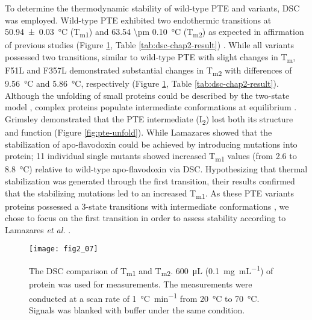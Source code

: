 \begin{refsection}
To determine the thermodynamic stability of wild-type PTE and variants, DSC was
employed.  Wild-type PTE exhibited two endothermic transitions at
\SI{50.94\pm0.03}{\celsius} (T\textsubscript{m1}) and \SI{63.54 \pm
0.10}{\celsius} (T\textsubscript{m2}) as expected in affirmation of previous
studies (Figure \ref{fig:dsc-chap2-result}, Table \ref{tab:dsc-chap2-result})
\cite{Baker2011b}. While all variants possessed two transitions, similar to
wild-type PTE with slight changes in T\textsubscript{m}, F51L and F357L
demonstrated substantial changes in T\textsubscript{m2} with differences of
\SI{9.56}{\celsius} and \SI{5.86}{\celsius}, respectively (Figure
\ref{fig:dsc-chap2-result}, Table \ref{tab:dsc-chap2-result}). Although the
unfolding of small proteins could be described by the two-state model
\cite{Jackson1998}, complex proteins populate intermediate conformations at
equilibrium \cite{Lamazares2015,Barrick1993,Gualfetti1999}. Grimsley  demonstrated that the PTE intermediate (I\textsubscript{2}) lost both
its structure and function \cite{Rochu2002b,Grimsley1997b} (Figure
\ref{fig:pte-unfold}). While Lamazares 
showed that the stabilization of apo-flavodoxin could be achieved by
introducing mutations into protein; 11 individual single mutants showed
increased T\textsubscript{m1} values (from 2.6 to \SI{8.8}{\celsius})
relative to wild-type apo-flavodoxin \cite{Lamazares2015} via DSC.
Hypothesizing that thermal stabilization was generated through the first
transition, their results confirmed that the stabilizing mutations led to an
increased T\textsubscript{m1}. As these PTE variants proteins possessed a
3-state transitions with intermediate conformations
\cite{Rochu2002b,Grimsley1997b}, we chose to focus on the first transition in
order to assess stability according to Lamazares \emph{et al.}
\cite{Lamazares2015}.
\begin{figure}[htbp] \centering \texttt{[image: fig2\_07]}
    \caption[The DSC comparison of T\textsubscript{m1} and T\textsubscript{m2}.
    \SI{600}{\micro\L} (\SI{0.1}{\mg\per\mL}) of protein was used for
    measurements. The measurements were conducted at a scan rate of
    \SI{1}{\celsius\per\minute} from \SI{20}{\celsius} to \SI{70}{\celsius}.
    Signals was blanked with buffer under the same condition.]{The DSC
        comparison of T\textsubscript{m1} and T\textsubscript{m2}.
        \SI{600}{\micro\L} (\SI{0.1}{\mg\per\mL}) of protein was used for
        measurements. The measurements were conducted at a scan rate of
        \SI{1}{\celsius\per\minute} from \SI{20}{\celsius} to
        \SI{70}{\celsius}.  Signals was blanked with buffer under the same
    condition.} 
    \label{fig:dsc-chap2-result}
\end{figure}


\end{refsection}
